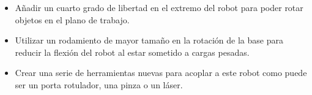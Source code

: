 \begin{itemize}
    \item Añadir un cuarto grado de libertad en el extremo del robot para poder rotar objetos en el plano de trabajo.
    \item Utilizar un rodamiento de mayor tamaño en la rotación de la base para reducir la flexión del robot al estar sometido 
    a cargas pesadas.
    \item Crear una serie de herramientas nuevas para acoplar a este robot como puede ser un porta rotulador, una pinza o un láser.
\end{itemize}


